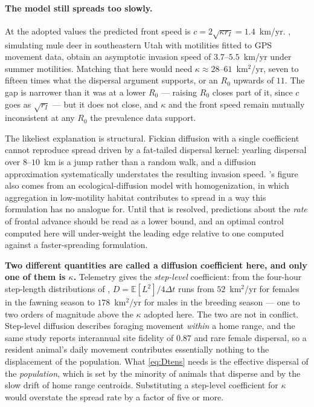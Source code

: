 \documentclass[11pt]{article}
\begin{document}
\paragraph{The model still spreads too slowly.} At the adopted values the predicted front speed is $c = 2\sqrt{\kappa r_I} = 1.4$~km/yr. \citet{Garlick2013}, simulating mule deer in southeastern Utah with motilities fitted to GPS movement data, obtain an asymptotic invasion speed of $3.7$--$5.5$~km/yr under summer motilities. Matching that here would need $\kappa \approx 28$--$61$~km$^2$/yr, seven to fifteen times what the dispersal argument supports, or an $R_0$ upwards of $11$. The gap is narrower than it was at a lower $R_0$ --- raising $R_0$ closes part of it, since $c$ goes as $\sqrt{r_I}$ --- but it does not close, and $\kappa$ and the front speed remain mutually inconsistent at any $R_0$ the prevalence data support.

The likeliest explanation is structural. Fickian diffusion with a single coefficient cannot reproduce spread driven by a fat-tailed dispersal kernel: yearling dispersal over $8$--$10$~km is a jump rather than a random walk, and a diffusion approximation systematically understates the resulting invasion speed. \citeauthor{Garlick2013}'s figure also comes from an ecological-diffusion model with homogenization, in which aggregation in low-motility habitat contributes to spread in a way this formulation has no analogue for. Until that is resolved, predictions about the \emph{rate} of frontal advance should be read as a lower bound, and an optimal control computed here will under-weight the leading edge relative to one computed against a faster-spreading formulation.

\textbf{Two different quantities are called a diffusion coefficient here, and only one of them is $\kappa$.} Telemetry gives the \emph{step-level} coefficient: from the four-hour step-length distributions of \citet{Gilbertson2025}, $D = \mathbb{E}[L^2]/4\Delta t$ runs from $52$~km$^2$/yr for females in the fawning season to $178$~km$^2$/yr for males in the breeding season --- one to two orders of magnitude above the $\kappa$ adopted here. The two are not in conflict. Step-level diffusion describes foraging movement \emph{within} a home range, and the same study reports interannual site fidelity of $0.87$ and rare female dispersal, so a resident animal's daily movement contributes essentially nothing to the displacement of the population. What \eqref{eq:Dtens} needs is the effective dispersal of the \emph{population}, which is set by the minority of animals that disperse and by the slow drift of home range centroids. Substituting a step-level coefficient for $\kappa$ would overstate the spread rate by a factor of five or more.
\end{document}
